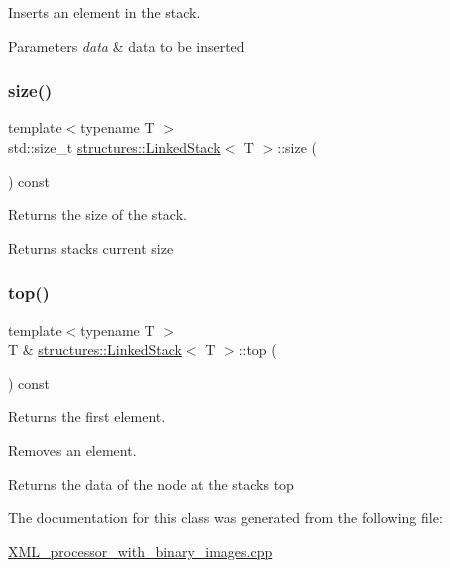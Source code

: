 Inserts an element in the stack. 


\begin{DoxyParams}{Parameters}
{\em data} & data to be inserted \\
\hline
\end{DoxyParams}
\mbox{\label{classstructures_1_1_linked_stack_ae1ca6a5a9b837471863f1c8bb23cfe1d}} 
\subsubsection{\texorpdfstring{size()}{size()}}
{\footnotesize\ttfamily template$<$typename T $>$ \\
std\+::size\+\_\+t \mbox{\hyperlink{classstructures_1_1_linked_stack}{structures\+::\+Linked\+Stack}}$<$ T $>$\+::size (\begin{DoxyParamCaption}{ }\end{DoxyParamCaption}) const}



Returns the size of the stack. 

\begin{DoxyReturn}{Returns}
stack\textquotesingle{}s current size 
\end{DoxyReturn}
\mbox{\label{classstructures_1_1_linked_stack_a14ab6e3507dd1206a87bba8c57e1733f}} 
\subsubsection{\texorpdfstring{top()}{top()}}
{\footnotesize\ttfamily template$<$typename T $>$ \\
T \& \mbox{\hyperlink{classstructures_1_1_linked_stack}{structures\+::\+Linked\+Stack}}$<$ T $>$\+::top (\begin{DoxyParamCaption}{ }\end{DoxyParamCaption}) const}



Returns the first element. 

Removes an element.

\begin{DoxyReturn}{Returns}
the data of the node at the stack\textquotesingle{}s top 
\end{DoxyReturn}


The documentation for this class was generated from the following file\+:\begin{DoxyCompactItemize}
\item 
\mbox{\hyperlink{_x_m_l__processor__with__binary__images_8cpp}{X\+M\+L\+\_\+processor\+\_\+with\+\_\+binary\+\_\+images.\+cpp}}\end{DoxyCompactItemize}
